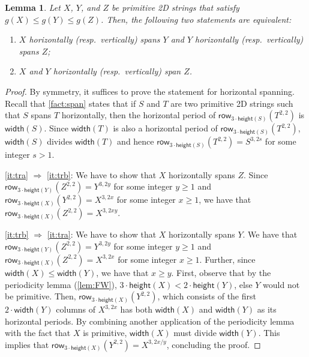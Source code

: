 \documentclass[11pt,letterpaper]{article}
\newcommand{\width}{\textsf{width}}
\newcommand{\height}{\textsf{height}}
\newcommand{\hspan}[2]{\textsf{row}_{3\cdot \height(#1)}(#2^{2,2})}
\newtheorem{lemma}[theorem]{Lemma}
\begin{document}
\begin{lemma}\label{lem:transitive}
Let $X$, $Y$, and $Z$ be primitive 2D strings that satisfy $g(X) \leq g(Y) \leq g(Z)$.
Then, the following two statements are equivalent:
\begin{enumerate}[label = ({\alph*})]
\item $X$ horizontally (resp.~vertically) spans $Y$ and $Y$ horizontally (resp.~vertically) spans $Z$;\label{it:tra}
\item $X$ and $Y$ horizontally (resp.~vertically) span $Z$.\label{it:trb}
\end{enumerate}
\end{lemma}
\begin{proof}
By symmetry, it suffices to prove the statement for horizontal spanning.
Recall that \cref{fact:span} states that if $S$ and $T$ are two primitive 2D strings such that $S$ spans $T$ horizontally, then the horizontal period of $\hspan{S}{T}$ is $\width(S)$.
Since $\width(T)$ is also a horizontal period of $\hspan{S}{T}$, $\width(S)$ divides $\width(T)$ and hence $\hspan{S}{T}=S^{3,2s}$ for some integer $s>1$.

\ref{it:tra} $\Rightarrow$ \ref{it:trb}:
We have to show that $X$ horizontally spans $Z$.
Since
$\hspan{Y}{Z}=Y^{3,2y}$ for some integer $y\geq 1$
and
$\hspan{X}{Y}=X^{3,2x}$ for some integer $x\geq 1$,
we have that $\hspan{X}{Z}=X^{3,2xy}$.

\ref{it:trb} $\Rightarrow$ \ref{it:tra}:
We have to show that $X$ horizontally spans $Y$.
We have that
$\hspan{Y}{Z}=Y^{3,2y}$ for some integer $y\geq 1$
and
$\hspan{X}{Z}=X^{3,2x}$ for some integer $x\geq 1$.
Further, since $\width(X)\leq \width(Y)$, we have that $x\geq y$.
First, observe that by the periodicity lemma (\cref{lem:FW}), $3\cdot \height(X) < 2\cdot \height(Y)$, else $Y$ would not be primitive.
Then, $\hspan{X}{Y}$,  which consists of the first $2\cdot \width(Y)$ columns of $X^{3,2x}$  has both $\width(X)$ and $\width(Y)$ as its horizontal periods.
By combining another application of the periodicity lemma with the fact that $X$ is primitive, $\width(X)$ must divide $\width(Y)$.
This implies that $\hspan{X}{Y}=X^{3,2x/y}$, concluding the proof.
\end{proof}
\end{document}
